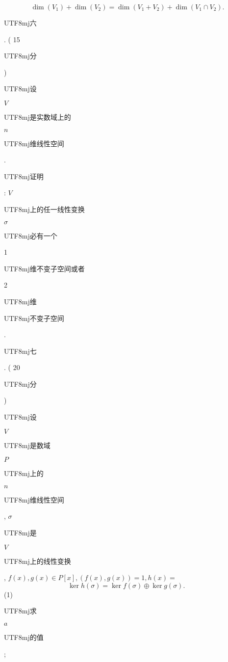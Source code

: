 \documentclass[10pt]{article}
\begin{document}
$$
\operatorname{dim}\left(V_{1}\right)+\operatorname{dim}\left(V_{2}\right)=\operatorname{dim}\left(V_{1}+V_{2}\right)+\operatorname{dim}\left(V_{1} \cap V_{2}\right) .
$$
\begin{CJK}{UTF8}{mj}六\end{CJK}. ( 15 \begin{CJK}{UTF8}{mj}分\end{CJK}) \begin{CJK}{UTF8}{mj}设\end{CJK} $V$ \begin{CJK}{UTF8}{mj}是实数域上的\end{CJK} $n$ \begin{CJK}{UTF8}{mj}维线性空间\end{CJK}. \begin{CJK}{UTF8}{mj}证明\end{CJK}: $V$ \begin{CJK}{UTF8}{mj}上的任一线性变换\end{CJK} $\sigma$ \begin{CJK}{UTF8}{mj}必有一个\end{CJK} 1 \begin{CJK}{UTF8}{mj}维不变子空间或者\end{CJK} 2 \begin{CJK}{UTF8}{mj}维\end{CJK} \begin{CJK}{UTF8}{mj}不变子空间\end{CJK}.

\begin{CJK}{UTF8}{mj}七\end{CJK}. ( 20 \begin{CJK}{UTF8}{mj}分\end{CJK}) \begin{CJK}{UTF8}{mj}设\end{CJK} $V$ \begin{CJK}{UTF8}{mj}是数域\end{CJK} $P$ \begin{CJK}{UTF8}{mj}上的\end{CJK} $n$ \begin{CJK}{UTF8}{mj}维线性空间\end{CJK}, $\sigma$ \begin{CJK}{UTF8}{mj}是\end{CJK} $V$ \begin{CJK}{UTF8}{mj}上的线性变换\end{CJK}, $f(x), g(x) \in P[x],(f(x), g(x))=1, h(x)=$
$$
\operatorname{ker} h(\sigma)=\operatorname{ker} f(\sigma) \oplus \operatorname{ker} g(\sigma) \text {. }
$$
(1) \begin{CJK}{UTF8}{mj}求\end{CJK} $a$ \begin{CJK}{UTF8}{mj}的值\end{CJK};
\end{document}
